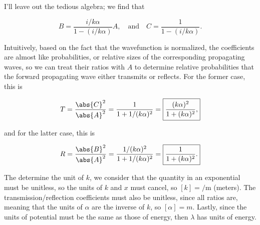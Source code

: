 I'll leave out the tedious algebra; we find that

\begin{equation}
  B = \frac{i/k\alpha}{1 - (i/k\alpha)}A, \quad\text{and}\quad C = \frac{1}{1 - (i/k\alpha)}.
\end{equation}

Intuitively, based on the fact that the wavefunction is normalized, the coefficients are almost like probabilities, or relative sizes of the corresponding propagating waves, so we can treat their ratios with $A$ to determine relative probabilities that the forward propagating wave either transmits or reflects. For the former case, this is

\begin{equation}
  T = \frac{\abs{C}^2}{\abs{A}^2} = \frac{1}{1 + 1/(k\alpha)^2} = \boxed{\frac{(k\alpha)^2}{1 + (k\alpha)^2},}
\end{equation}

and for the latter case, this is

\begin{equation}
  R = \frac{\abs{B}^2}{\abs{A}^2} = \frac{1/(k\alpha)^2}{1 + 1/(k\alpha)^2} = \boxed{\frac{1}{1 + (k\alpha)^2}.}
\end{equation}

The determine the unit of $k$, we consider that the quantity in an exponential must be unitless, so the units of $k$ and $x$ must cancel, so $[k] = \unit{\per\meter}$ (meters). The transmission/reflection coefficients must also be unitless, since all ratios are, meaning that the units of $\alpha$ are the inverse of $k$, so $[\alpha] = m$. Lastly, since the units of potential must be the same as those of energy, then $\lambda$ has units of energy.



